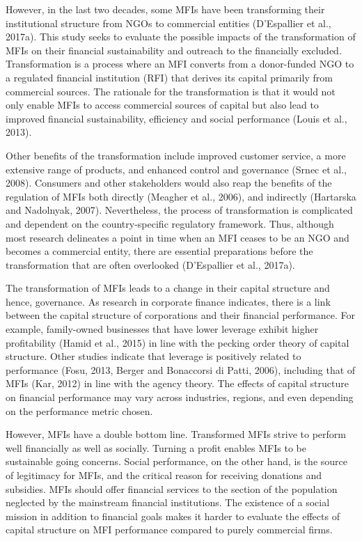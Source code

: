 \documentclass[a4paper, nobind]{templates/ociamthesis}
\begin{document}
However, in the last two decades, some MFIs have been transforming their institutional structure from NGOs to commercial entities (D'Espallier et al., 2017a). This study seeks to evaluate the possible impacts of the transformation of MFIs on their financial sustainability and outreach to the financially excluded. Transformation is a process where an MFI converts from a donor-funded NGO to a regulated financial institution (RFI) that derives its capital primarily from commercial sources. The rationale for the transformation is that it would not only enable MFIs to access commercial sources of capital but also lead to improved financial sustainability, efficiency and social performance (Louis et al., 2013).

Other benefits of the transformation include improved customer service, a more extensive range of products, and enhanced control and governance (Srnec et al., 2008). Consumers and other stakeholders would also reap the benefits of the regulation of MFIs both directly (Meagher et al., 2006), and indirectly (Hartarska and Nadolnyak, 2007). Nevertheless, the process of transformation is complicated and dependent on the country-specific regulatory framework. Thus, although most research delineates a point in time when an MFI ceases to be an NGO and becomes a commercial entity, there are essential preparations before the transformation that are often overlooked (D'Espallier et al., 2017a).

The transformation of MFIs leads to a change in their capital structure and hence, governance. As research in corporate finance indicates, there is a link between the capital structure of corporations and their financial performance. For example, family-owned businesses that have lower leverage exhibit higher profitability (Hamid et al., 2015) in line with the pecking order theory of capital structure. Other studies indicate that leverage is positively related to performance (Fosu, 2013, Berger and Bonaccorsi di Patti, 2006), including that of MFIs (Kar, 2012) in line with the agency theory. The effects of capital structure on financial performance may vary across industries, regions, and even depending on the performance metric chosen.

However, MFIs have a double bottom line. Transformed MFIs strive to perform well financially as well as socially. Turning a profit enables MFIs to be sustainable going concerns. Social performance, on the other hand, is the source of legitimacy for MFIs, and the critical reason for receiving donations and subsidies. MFIs should offer financial services to the section of the population neglected by the mainstream financial institutions. The existence of a social mission in addition to financial goals makes it harder to evaluate the effects of capital structure on MFI performance compared to purely commercial firms.
\end{document}
